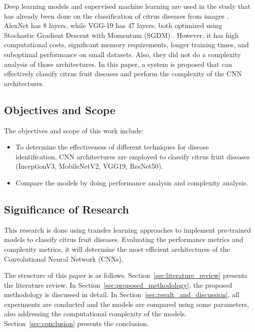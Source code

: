 \documentclass{ijcaArticle}
\begin{document}
Deep learning models and supervised machine learning are used in the study that has already been done on the classification of citrus diseases from images \cite{p2, p5, p8}. AlexNet has 8 layers, while VGG-19 has 47 layers, both optimized using Stochastic Gradient Descent with Momentum (SGDM) \cite{p5}. However, it has high computational costs, significant memory requirements, longer training times, and suboptimal performance on small datasets. Also, they did not do a complexity analysis of those architectures. In this paper, a system is proposed that can effectively classify citrus fruit diseases and perform the complexity of the CNN architectures.

\subsection{Objectives and Scope}

The objectives and scope of this work include:

\begin{itemize}

    \item To determine the effectiveness of different techniques for disease identification, CNN architectures are employed to classify citrus fruit diseases (InceptionV3, MobileNetV2, VGG19, ResNet50).

    \item Compare the models by doing performance analysis and complexity analysis.

\end{itemize}

\subsection{Significance of Research}

This research is done using transfer learning approaches to implement pre-trained models to classify citrus fruit diseases. Evaluating the performance metrics and complexity metrics, it will determine the most efficient architectures of the Convolutional Neural Network (CNNs).

The structure of this paper is as follows. Section~\ref{sec:literature_review} presents the literature review. In Section~\ref{sec:proposed_methodology}, the proposed methodology is discussed in detail. In Section~\ref{sec:result_and_discussion}, all experiments are conducted and the models are compared using some parameters, also addressing the computational complexity of the models. Section~\ref{sec:conclusion} presents the conclusion.
\end{document}
